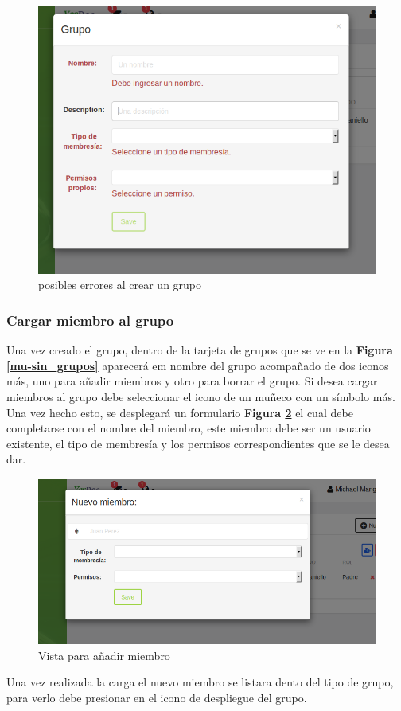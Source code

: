     \begin{figure}
    	\centering
    	\includegraphics[width=.8\textwidth]{img/manual_de_usuario/crear_grupo_errores}
    	\caption{posibles errores al crear un grupo}
    	\label{mu-crear_grupo_errores}
    \end{figure}


\subsubsection{Cargar miembro al grupo}

Una vez creado el grupo, dentro de la tarjeta de grupos que se ve en la \textbf{Figura \ref{mu-sin_grupos}} aparecerá em nombre del grupo acompañado de dos iconos más, uno para añadir miembros y otro para borrar el grupo. Si desea cargar miembros al grupo debe seleccionar el icono de un muñeco con un símbolo más. Una vez hecho esto, se desplegará un formulario \textbf{Figura \ref{mu-anadir_miembro}} el cual debe completarse con el nombre del miembro, este miembro debe ser un usuario existente, el tipo de membresía y los permisos correspondientes que se le desea dar.
    \begin{figure}
    	\centering
    	\includegraphics[width=.8\textwidth]{img/manual_de_usuario/aniadir_miembro}
    	\caption{Vista para añadir miembro}
    	\label{mu-anadir_miembro}
    \end{figure}
Una vez realizada la carga el nuevo miembro se listara dento del tipo de grupo, para verlo debe presionar en el icono de despliegue del grupo.

